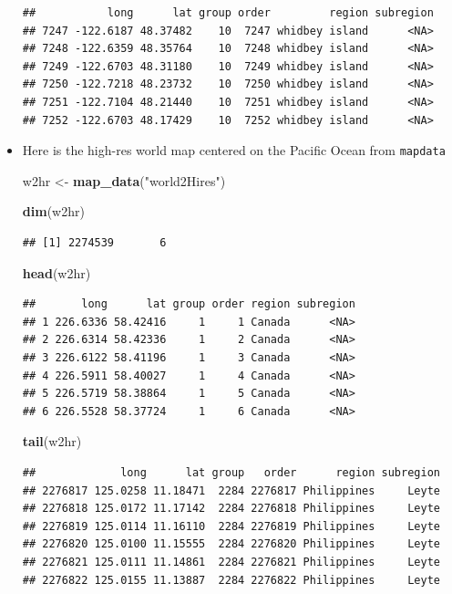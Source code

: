 \documentclass[]{book}
\newenvironment{Shaded}{\begin{snugshade}}{\end{snugshade}}
\newcommand{\KeywordTok}[1]{\textcolor[rgb]{0.13,0.29,0.53}{\textbf{{#1}}}}
\newcommand{\StringTok}[1]{\textcolor[rgb]{0.31,0.60,0.02}{{#1}}}
\newcommand{\NormalTok}[1]{{#1}}
\theoremstyle{definition}
\theoremstyle{definition}
\theoremstyle{remark}
\begin{document}
\begin{itemize}
\begin{verbatim}
##           long      lat group order         region subregion
## 7247 -122.6187 48.37482    10  7247 whidbey island      <NA>
## 7248 -122.6359 48.35764    10  7248 whidbey island      <NA>
## 7249 -122.6703 48.31180    10  7249 whidbey island      <NA>
## 7250 -122.7218 48.23732    10  7250 whidbey island      <NA>
## 7251 -122.7104 48.21440    10  7251 whidbey island      <NA>
## 7252 -122.6703 48.17429    10  7252 whidbey island      <NA>
\end{verbatim}
\item
  Here is the high-res world map centered on the Pacific Ocean from
  \texttt{mapdata}

\begin{Shaded}
\begin{Highlighting}[]
\NormalTok{w2hr <-}\StringTok{ }\KeywordTok{map_data}\NormalTok{(}\StringTok{"world2Hires"}\NormalTok{)}

\KeywordTok{dim}\NormalTok{(w2hr)}
\end{Highlighting}
\end{Shaded}

\begin{verbatim}
## [1] 2274539       6
\end{verbatim}

\begin{Shaded}
\begin{Highlighting}[]
\KeywordTok{head}\NormalTok{(w2hr)}
\end{Highlighting}
\end{Shaded}

\begin{verbatim}
##       long      lat group order region subregion
## 1 226.6336 58.42416     1     1 Canada      <NA>
## 2 226.6314 58.42336     1     2 Canada      <NA>
## 3 226.6122 58.41196     1     3 Canada      <NA>
## 4 226.5911 58.40027     1     4 Canada      <NA>
## 5 226.5719 58.38864     1     5 Canada      <NA>
## 6 226.5528 58.37724     1     6 Canada      <NA>
\end{verbatim}

\begin{Shaded}
\begin{Highlighting}[]
\KeywordTok{tail}\NormalTok{(w2hr)}
\end{Highlighting}
\end{Shaded}

\begin{verbatim}
##             long      lat group   order      region subregion
## 2276817 125.0258 11.18471  2284 2276817 Philippines     Leyte
## 2276818 125.0172 11.17142  2284 2276818 Philippines     Leyte
## 2276819 125.0114 11.16110  2284 2276819 Philippines     Leyte
## 2276820 125.0100 11.15555  2284 2276820 Philippines     Leyte
## 2276821 125.0111 11.14861  2284 2276821 Philippines     Leyte
## 2276822 125.0155 11.13887  2284 2276822 Philippines     Leyte
\end{verbatim}
\end{itemize}
\end{document}
